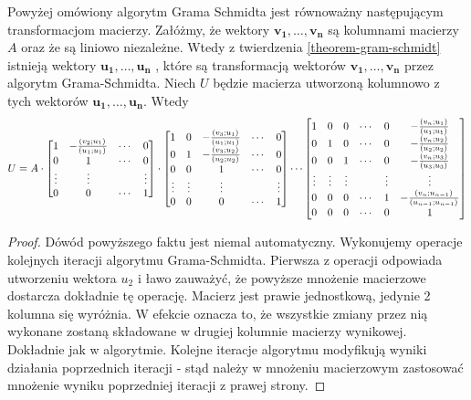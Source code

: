 \documentclass[10pt,a4paper]{report}
\newcommand{\vr}[1]{\mathbf{#1}}
\newcommand{\mx}[1]{{#1}}
\newcommand{\proj}[2]{\frac{\scalar{#2}{#1}}{\scalar{#1}{#1}}}
\begin{document}
\begin{lemma} \label{lemma-matrix-formulation-of-gs}
Powyżej omówiony algorytm Grama Schmidta jest równoważny następującym transformacjom macierzy. Załóżmy, że wektory $\vr{v_1}, \ldots, \vr{v_n}$ są kolumnami macierzy $\mx{A}$ oraz że są liniowo niezależne. Wtedy z twierdzenia \ref{theorem-gram-schmidt} istnieją wektory $\vr{u_1}, \ldots, \vr{u_n}$ , które są transformacją wektorów $\vr{v_1}, \ldots, \vr{v_n}$ przez algorytm Grama-Schmidta. Niech $\mx{U}$ będzie macierza utworzoną kolumnowo z tych wektorów $\vr{u_1}, \ldots, \vr{u_n}$. Wtedy
{\small
$$
U = A \cdot 
\begin{bmatrix}
1 & -\proj{u_1}{v_2} & \cdots & 0 \\
0 & 1 & \cdots & 0 \\
\vdots & \vdots & & \vdots \\
0 & 0 & \cdots & 1
\end{bmatrix} \cdot
\begin{bmatrix}
1 & 0 & -\proj{u_1}{v_3} &\cdots & 0 \\
0 & 1 & -\proj{u_2}{v_3} &\cdots & 0 \\
0 & 0 & 1 & \cdots & 0 \\
\vdots & \vdots & \vdots &  & \vdots \\
0 & 0 & 0 & \cdots & 1
\end{bmatrix}
 \cdots
\begin{bmatrix}
1 & 0 & 0 & \cdots & 0 & -\proj{u_1}{v_n} \\
0 & 1 & 0 & \cdots & 0 &-\proj{u_2}{v_n} \\
0 & 0 & 1 & \cdots & 0 & -\proj{u_3}{v_n} \\
\vdots & \vdots & \vdots &  & \vdots & \vdots \\
0 & 0 & 0 & \cdots & 1 & -\proj{u_{n-1}}{v_n} \\
0 & 0 & 0 & \cdots & 0 & 1
\end{bmatrix}
$$ 
}
\end{lemma}
\begin{proof}
Dówód powyższego faktu jest niemal automatyczny. Wykonujemy operacje kolejnych iteracji algorytmu Grama-Schmidta. Pierwsza z operacji odpowiada utworzeniu wektora $u_2$ i ławo zauważyć, że powyższe mnożenie macierzowe dostarcza dokładnie tę operację. Macierz jest prawie jednostkową, jedynie 2 kolumna się wyróżnia. W efekcie oznacza to, że wszystkie zmiany przez nią wykonane zostaną składowane w drugiej kolumnie macierzy wynikowej. Dokładnie jak w algorytmie. Kolejne iteracje algorytmu modyfikują wyniki działania poprzednich iteracji - stąd należy w mnożeniu macierzowym zastosować mnożenie wyniku poprzedniej iteracji z prawej strony. 
\end{proof}
\end{document}
